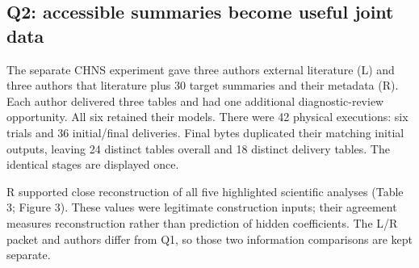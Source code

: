 \documentclass[10pt,twocolumn]{article}
\begin{document}
\subsection{Q2: accessible summaries become useful joint data}

The separate CHNS experiment gave three authors external literature (L) and three authors that literature plus 30 target summaries and their metadata (R). Each author delivered three tables and had one additional diagnostic-review opportunity. All six retained their models. There were 42 physical executions: six trials and 36 initial/final deliveries. Final bytes duplicated their matching initial outputs, leaving 24 distinct tables overall and 18 distinct delivery tables. The identical stages are displayed once.


R supported close reconstruction of all five highlighted scientific analyses (Table 3; Figure 3). These values were legitimate construction inputs; their agreement measures reconstruction rather than prediction of hidden coefficients. The L/R packet and authors differ from Q1, so those two information comparisons are kept separate.
\end{document}
